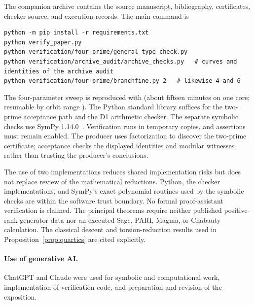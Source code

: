 \documentclass[11pt,letterpaper]{article}
\theoremstyle{definition}\newtheorem{definition}[theorem]{Definition}
\theoremstyle{remark}\newtheorem{remark}[theorem]{Remark}
\begin{document}
The companion archive contains the source manuscript, bibliography, certificates, checker source, and execution records. The main command is
\begin{verbatim}
python -m pip install -r requirements.txt
python verify_paper.py
python verification/four_prime/general_type_check.py
python verification/archive_audit/archive_checks.py   # curves and identities of the archive audit
python verification/four_prime/branchfine.py 2   # likewise 4 and 6
\end{verbatim}
The four-parameter sweep is reproduced with  (about fifteen minutes on one core; resumable by orbit range ).
The Python standard library suffices for the two-prime acceptance path and the D1 arithmetic checker. The separate symbolic checks use SymPy 1.14.0~\cite{SymPy}. Verification runs in temporary copies, and assertions must remain enabled. The producer uses factorization to discover the two-prime certificate; acceptance checks the displayed identities and modular witnesses rather than trusting the producer's conclusions.

The use of two implementations reduces shared implementation risks but does not replace review of the mathematical reductions. Python, the checker implementations, and SymPy's exact polynomial routines used by the symbolic checks are within the software trust boundary. No formal proof-assistant verification is claimed. The principal theorems require neither published positive-rank generator data nor an executed Sage, PARI, Magma, or Chabauty calculation. The classical descent and torsion-reduction results used in Proposition~\ref{prop:quartics} are cited explicitly.

\paragraph{Use of generative AI.}
ChatGPT and Claude were used for symbolic and computational work, implementation of verification code, and preparation and revision of the exposition.

\appendix



\end{document}
